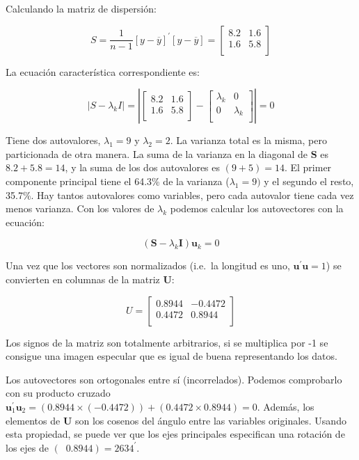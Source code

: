 \documentclass[]{book}
\theoremstyle{definition}
\theoremstyle{definition}
\theoremstyle{definition}
\theoremstyle{remark}
\begin{document}
Calculando la matriz de dispersión:

\[
S = \frac{1}{n - 1}\left\lbrack y - \overline{y} \right\rbrack^{'}\left\lbrack y - \overline{y} \right\rbrack = \begin{bmatrix}
8.2 & 1.6 \\
1.6 & 5.8 \\
\end{bmatrix}
\]

La ecuación característica correspondiente es:

\[
\left| S - \lambda_{k}I \right| = \left| \begin{bmatrix}
8.2 & 1.6 \\
1.6 & 5.8 \\
\end{bmatrix} - \begin{bmatrix}
\lambda_{k} & 0 \\
0 & \lambda_{k} \\
\end{bmatrix} \right| = 0
\]

Tiene dos autovalores, \(\lambda_{1} = 9\) y \(\lambda_{2} = 2\). La
varianza total es la misma, pero particionada de otra manera. La suma de
la varianza en la diagonal de \(\mathbf{S}\) es \(8.2 + 5.8 = 14\), y la
suma de los dos autovalores es \((9 + 5) = 14\). El primer componente
principal tiene el 64.3\% de la varianza (\(\lambda_{1} = 9)\) y el
segundo el resto, 35.7\%. Hay tantos autovalores como variables, pero
cada autovalor tiene cada vez menos varianza. Con los valores de
\(\lambda_{k}\) podemos calcular los autovectores con la ecuación:

\[
\left( \mathbf{S} - \lambda_{k}\mathbf{I} \right)\mathbf{u}_{k} = 0
\]

Una vez que los vectores son normalizados (i.e.~la longitud es uno,
\(\mathbf{u}^{'}\mathbf{u} = 1\)) se convierten en columnas de la matriz
\(\mathbf{U}\):

\[
U = \begin{bmatrix}
0.8944 & - 0.4472 \\
0.4472 & 0.8944 \\
\end{bmatrix}
\]

Los signos de la matriz son totalmente arbitrarios, si se multiplica por
-1 se consigue una imagen especular que es igual de buena representando
los datos.

Los autovectores son ortogonales entre sí (incorrelados). Podemos
comprobarlo con su producto cruzado
\(\mathbf{u}_{1}^{'}\mathbf{u}_{2} = \left( 0.8944 \times \left( - 0.4472 \right) \right) + \left( 0.4472 \times 0.8944 \right) = 0\).
Además, los elementos de \(\mathbf{U}\) son los cosenos del ángulo entre
las variables originales. Usando esta propiedad, se puede ver que los
ejes principales especifican una rotación de los ejes de
\(\left( \operatorname{}{0.8944} \right) = 2634^{'}\).
\end{document}
